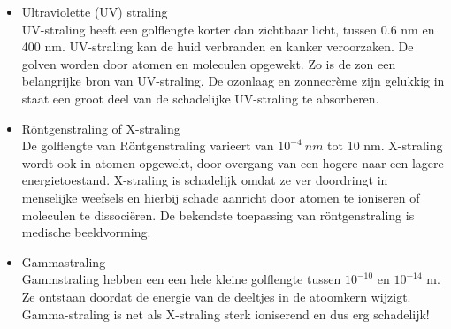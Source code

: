 \begin{itemize}
     \item Ultraviolette (UV) straling \\
     UV-straling heeft een golflengte korter dan zichtbaar licht, tussen 0.6 nm en 400 nm. UV-straling kan de huid verbranden en kanker veroorzaken. De golven worden door atomen en moleculen opgewekt. Zo is de zon een belangrijke bron van UV-straling. De ozonlaag en zonnecr\`eme zijn gelukkig in staat een groot deel van de schadelijke UV-straling te absorberen.
     \item R\"ontgenstraling of X-straling \\
     De golflengte van R\"ontgenstraling varieert van $10^{-4} ~ nm$ tot 10 nm. X-straling wordt ook in atomen opgewekt, door overgang van een hogere naar een lagere energietoestand. X-straling is schadelijk omdat ze ver doordringt in menselijke weefsels en hierbij schade aanricht door atomen te ioniseren of moleculen te dissoci\"eren. De bekendste toepassing van r\"ontgenstraling is medische beeldvorming. 
     \item Gammastraling \\
     Gammstraling hebben een een hele kleine golflengte tussen $10^{-10}$ en $10^{-14}$ m. Ze ontstaan doordat de energie van de deeltjes in de atoomkern wijzigt. Gamma-straling is net als X-straling sterk ioniserend en dus erg schadelijk!
    
 \end{itemize}


